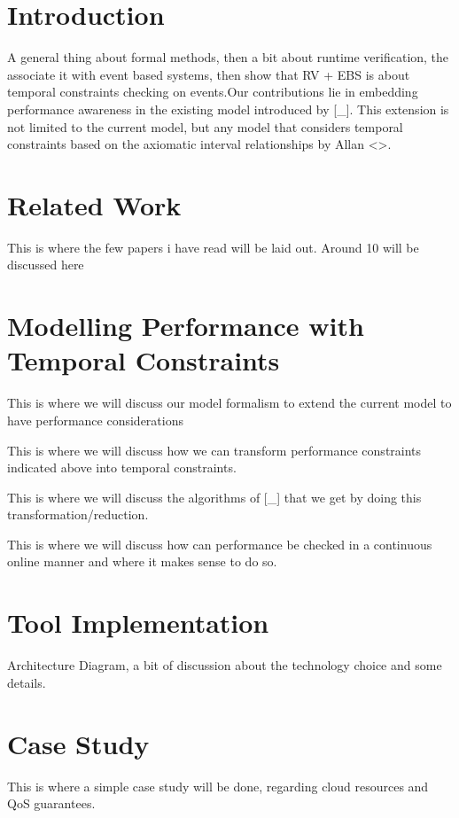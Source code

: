 \documentclass{article}
\author[1]{George Fakidis}
\affil[1]{Department of Computer Science, Athens University of Economics and Business}
\begin{document}
\section{Introduction}
A general thing about formal methods, then a bit about runtime verification, the associate it with event based systems, then show that RV + EBS is about temporal constraints checking on events.Our contributions lie in embedding performance awareness in the existing model introduced by [_]. This extension is not limited to the current model, but any model that considers temporal constraints based on the axiomatic interval relationships by Allan <>.
\section{Related Work}
This is where the few papers i have read will be laid out. Around 10 will be discussed here
\section{Modelling Performance with Temporal Constraints}
This is where we will discuss our model formalism to extend the current model to have performance considerations
\par
This is where we will discuss how we can transform performance constraints indicated above into temporal constraints.
\par
This is where we will discuss the algorithms of [_] that we get by doing this transformation/reduction.
\par
This is where we will discuss how can performance be checked in a continuous online manner and where it makes sense to do so.

\section{Tool Implementation}
Architecture Diagram, a bit of discussion about the technology choice and some details.
\section{Case Study}
This is where a simple case study will be done, regarding cloud resources and QoS guarantees.
\end{document}
